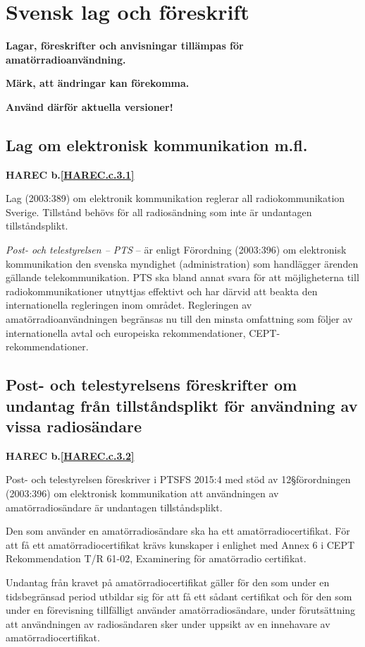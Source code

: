 \section{Svensk lag och föreskrift}

\textbf{Lagar, föreskrifter och anvisningar tillämpas för
  amatörradioanvändning.}

\textbf{Märk, att ändringar kan förekomma.}

\textbf{Använd därför aktuella versioner!}


\subsection{Lag om elektronisk kommunikation m.fl.}
\textbf{
HAREC b.\ref{HAREC.c.3.1}\label{myHAREC.c.3.1}
}

Lag (2003:389) om elektronik kommunikation reglerar all radiokommunikation
Sverige.
Tillstånd behövs för all radiosändning som inte är undantagen tillståndsplikt.

\emph{Post- och telestyrelsen -- PTS} -- är enligt Förordning (2003:396) om
elektronisk kommunikation den svenska myndighet (administration) som handlägger
ärenden gällande telekommunikation. PTS ska bland annat svara för att
möjligheterna till radiokommunikationer utnyttjas effektivt och har därvid att
beakta den internationella regleringen inom området. Regleringen av
amatörradioanvändningen begränsas nu till den minsta omfattning som
följer av internationella avtal och europeiska rekommendationer,
CEPT-rekommendationer.

\subsection{Post- och telestyrelsens föreskrifter om undantag från tillståndsplikt för användning av vissa radiosändare}
\textbf{
HAREC b.\ref{HAREC.c.3.2}\label{myHAREC.c.3.2}
}

Post- och telestyrelsen föreskriver i PTSFS 2015:4 med stöd av 12\S förordningen
(2003:396) om elektronisk kommunikation att användningen av amatörradiosändare
är undantagen tillståndsplikt.

Den som använder en amatörradiosändare ska ha ett amatörradiocertifikat.
För att få ett amatörradiocertifikat krävs kunskaper i enlighet med Annex 6 i
CEPT Rekommendation T/R 61-02, Examinering för amatörradio certifikat.

Undantag från kravet på amatörradiocertifikat gäller för den som under en
tidsbegränsad period utbildar sig för att få ett sådant certifikat och för
den som under en förevisning tillfälligt använder amatörradiosändare, under
förutsättning att användningen av radiosändaren sker under uppsikt av en
innehavare av amatörradiocertifikat.

